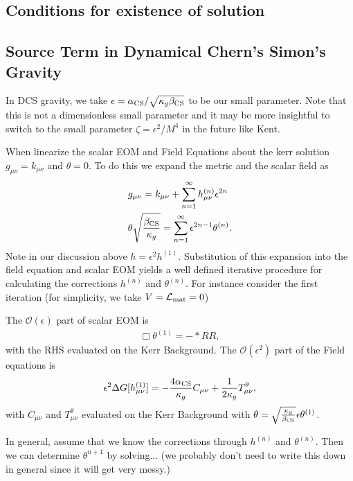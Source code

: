 \documentclass[aps,prd,amsmath,showpacs,amssymb,superscriptaddress,nofootinbib,longbibliography,eqsecnum,preprintnumbers]{revtex4-1}
\newcommand{\acs}{\alpha_{\rm CS}}
\newcommand{\bcs}{\beta_{\rm CS}}
\begin{document}
\subsection{Conditions for existence of solution}

\subsection{Source Term in Dynamical Chern's Simon's Gravity}

In DCS gravity, we take $\epsilon=\acs/\sqrt{\kappa_g \bcs}$ to be our small parameter. Note that this is not a dimensionless small parameter and it may be more insightful to switch to the small parameter $\zeta =\epsilon^2/M^4$ in the future like Kent.

When linearize the scalar EOM and Field Equations about the kerr solution $g_{\mu\nu}=k_{\mu\nu}$ and $\theta =0$. To do this we expand the metric and the scalar field as
\begin{align}
&g_{\mu \nu}=k_{\mu\nu} +\sum_{n=1}^\infty h_{\mu\nu}^{(n)}\epsilon^{2n} \nonumber \\
&\theta \sqrt{\frac{\bcs}{\kappa_g}}=\sum_{n=1}^\infty \epsilon^{2n-1}\theta^{(n)}.
\end{align}
Note in our discussion above $h=\epsilon^{2}h^{(1)}$.
Substitution of this expansion into the field equation and scalar EOM yields a well defined iterative procedure for calculating the corrections $h^{(n)}$ and $\theta^{(n)}$. For instance consider the first iteration (for simplicity, we take $V=\mathcal{L}_{\rm mat}=0$)

The $\mathcal{O}(\epsilon)$ part of scalar EOM is
\begin{align}
\Box \theta^{(1)}=-*RR,
\end{align}
with the RHS evaluated on the Kerr Background. The $\mathcal{O}(\epsilon^2)$ part of the Field equations is
\begin{align}
\epsilon^2\Delta G[h^{(1)}_{\mu\nu}]=-\frac{4\acs}{\kappa_g}C_{\mu \nu}+\frac{1}{2\kappa_g}T_{\mu\nu}^\theta, \label{eq:Source}
\end{align}
with $C_{\mu\nu}$ and $T^\theta_{\mu\nu}$ evaluated on the Kerr Background with $\theta=\sqrt{\frac{\kappa_g}{\bcs}}\epsilon\theta^{(1)}$. 

In general, assume that we know the corrections through $h^{(n)}$ and $\theta^{(n)}$. Then we can determine $\theta^{n+1}$ by solving... (we probably don't need to write this down in general since it will get very messy.)
\end{document}
